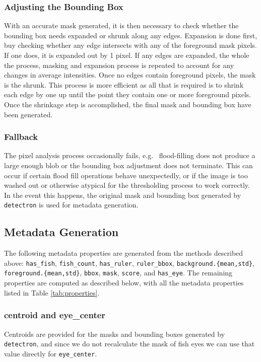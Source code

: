 \documentclass[conference]{IEEEtran}
\begin{document}
\subsubsection{Adjusting the Bounding Box}
With an accurate mask generated, it is then necessary to check whether the bounding box needs expanded or shrunk along any edges. Expansion is done first, buy checking whether any edge intersects with any of the foreground mask pixels. If one does, it is expanded out by 1 pixel. If any edges are expanded, the whole the process, masking and expansion process is repeated to account for any changes in average intensities. Once no edges contain foreground pixels, the mask is the shrunk. This process is more efficient as all that is required is to shrink each edge by one up until the point they contain one or more foreground pixels. Once the shrinkage step is accomplished, the final mask and bounding box have been generated.

\subsubsection{Fallback} The pixel analysis process occasionally fails,
e.g.~ flood-filling does not produce a large enough blob or
the bounding box adjustment does not terminate.
This can occur if certain flood fill operations behave unexpectedly, or if the image is too washed out or otherwise atypical for the thresholding process to work correctly. In the event this happens, the original mask and bounding box generated by \verb|detectron| is used for metadata generation.

\subsection{Metadata Generation}

The following metadata properties are generated from the methods
described above:
\verb|has_fish|, \verb|fish_count|, \verb|has_ruler|, \verb|ruler_bbox|, \verb|background.{mean,std}|, \verb|foreground.{mean,std}|, \verb|bbox|, \verb|mask|, \verb|score|, and \verb|has_eye|.
The remaining properties are computed as described below, with all the
metadata properties listed in Table \ref{tab:properties}.

\subsubsection{centroid and eye\_center}
Centroids are provided for the masks and bounding boxes generated by \verb|detectron|, and since we do not recalculate the mask of fish eyes we can use that value directly for \verb|eye_center|.
\end{document}
